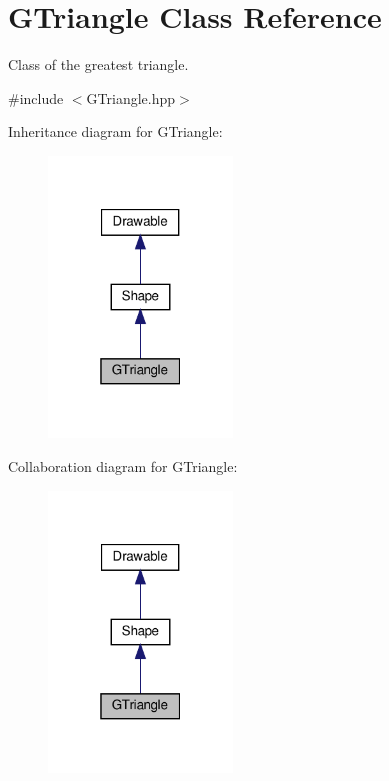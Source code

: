 \hypertarget{classGTriangle}{}\section{G\+Triangle Class Reference}
\label{classGTriangle}


Class of the greatest triangle.  




{\ttfamily \#include $<$G\+Triangle.\+hpp$>$}



Inheritance diagram for G\+Triangle\+:\nopagebreak
\begin{figure}[H]
\begin{center}
\leavevmode
\includegraphics[width=139pt]{classGTriangle__inherit__graph}
\end{center}
\end{figure}


Collaboration diagram for G\+Triangle\+:\nopagebreak
\begin{figure}[H]
\begin{center}
\leavevmode
\includegraphics[width=139pt]{classGTriangle__coll__graph}
\end{center}
\end{figure}
